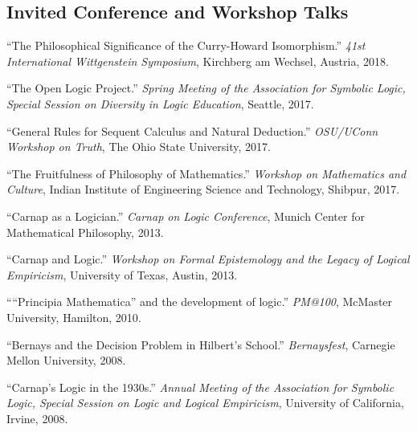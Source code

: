 \documentclass[11pt]{article}
\def\printdate#1{\xprintdate#1-}
\def\xprintdate#1-#2-#3-{#1}
\begin{document}
\subsection{Invited Conference and Workshop Talks}


\ind ``The Philosophical Significance of the Curry-Howard Isomorphism.'' \emph{41st International Wittgenstein Symposium}, Kirchberg am Wechsel, Austria, \printdate{2018-08-06}.




\ind ``The Open Logic Project.'' \emph{Spring Meeting of the Association for Symbolic Logic, Special Session on
Diversity in Logic Education}, Seattle, \printdate{2017-04-13}.



\ind ``General Rules for Sequent Calculus and Natural Deduction.'' \emph{OSU/UConn Workshop on Truth}, The Ohio State University, \printdate{2017-03-30}.



\ind ``The Fruitfulness of Philosophy of Mathematics.'' \emph{Workshop on Mathematics and Culture}, Indian Institute of Engineering Science and Technology, Shibpur, \printdate{2017-01-03}.
















\ind ``Carnap as a Logician.'' \emph{Carnap on Logic Conference}, Munich Center for Mathematical Philosophy, \printdate{2013-07-06}.



\ind ``Carnap and Logic.'' \emph{Workshop on Formal Epistemology and the Legacy of Logical Empiricism}, University of Texas, Austin, \printdate{2013-04-27}.









\ind ````Principia Mathematica'' and the development of logic.'' \emph{PM@100}, McMaster University, Hamilton, \printdate{2010-05-023}.




\ind ``Bernays and the Decision Problem in Hilbert's School.'' \emph{Bernaysfest}, Carnegie Mellon University, \printdate{2008-11-15}.




\ind ``Carnap's Logic in the 1930s.'' \emph{Annual Meeting of the Association for Symbolic Logic, Special Session on
Logic and Logical Empiricism}, University of California, Irvine, \printdate{2008-03-28}.
\end{document}
